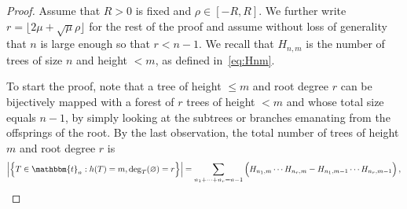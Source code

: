 \documentclass{article}
\newcommand{\bbt}{\mathbbm{t}}
\newcommand{\1}{\mathbbm{1}}								%
\theoremstyle{definition}
\numberwithin{equation}{section}
\begin{document}
\begin{proof}
    Assume that $R>0$ is fixed and $\rho\in[-R,R]$.
    We further write $r=\lfloor2\mu+\sqrt{\mu}\rho\rfloor$ for the rest of the proof and assume without loss of generality that $n$ is large enough so that $r<n-1$.
    We recall that $H_{n,m}$ is the number of trees of size $n$ and height $<m$, as defined in~\eqref{eq:Hnm}.

    To start the proof, note that a tree of height $\leq m$ and root degree $r$ can be bijectively mapped with a forest of $r$ trees of height $<m$ and whose total size equals $n-1$, by simply looking at the subtrees or branches emanating from the offsprings of the root. By the last observation, the total number of trees of height $m$ and root degree $r$ is
    \begin{align*}
        \Big|\Big\{T\in\bbt_n:h(T)=m,\deg_{T}(\varnothing)=r\Big\}\Big|=\sum_{n_1+\cdots+n_r=n-1}\Big(H_{n_1,m}\cdots H_{n_r,m}-H_{n_1,m-1}\cdots H_{n_r,m-1}\Big)\,,
    \end{align*}


\end{proof}
\end{document}
